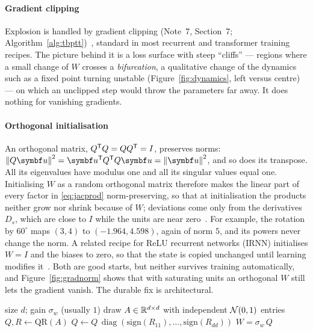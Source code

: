 \documentclass[11pt]{article}
\newcommand{\diag}{\operatorname{diag}}
\begin{document}
\paragraph{Gradient clipping} Explosion is handled by gradient clipping (Note~7, Section~7;
Algorithm~\ref{alg:tbptt})~\cite{pascanu2013}, standard in most recurrent and transformer training recipes. The picture
behind it is a loss surface with steep ``cliffs'' --- regions where a small change of $W$ crosses a \emph{bifurcation}, a
qualitative change of the dynamics such as a fixed point turning unstable (Figure~\ref{fig:dynamics}, left versus
centre) --- on which an unclipped step would throw the parameters far away. It does nothing for vanishing gradients.

\paragraph{Orthogonal initialisation} An orthogonal matrix, $Q^{\mathsf{T}} Q = QQ^{\mathsf{T}} = I$, preserves norms:
$\norm{Q\vect{u}}^2 = \vect{u}\T Q\T Q\vect{u} = \norm{\vect{u}}^2$, and so does its transpose. All its eigenvalues have
modulus one and all its singular values equal one. Initialising $W$ as a random orthogonal matrix therefore makes the
linear part of every factor in \eqref{eq:jacprod} norm-preserving, so that at initialisation the products neither
grow nor shrink because of $W$; deviations come only from the derivatives $D_s$, which are close to $I$ while the units
are near zero~\cite{saxe2014}. For example, the rotation by $60^\circ$ maps $(3, 4)$ to $(-1.964, 4.598)$, again of norm
$5$, and its powers never change the norm. A related recipe for ReLU recurrent networks (IRNN) initialises $W = I$ and the
biases to zero, so that the state is copied unchanged until learning modifies it~\cite{le2015}. Both are good starts, but
neither survives training automatically, and Figure~\ref{fig:gradnorm} shows that with saturating units an orthogonal $W$
still lets the gradient vanish. The durable fix is architectural.

\begin{algorithm}[htbp]
\caption{Random orthogonal initialisation of a recurrent matrix}\label{alg:orth}
\begin{algorithmic}[1]
\Require size $d$; gain $\sigma_w$ (usually $1$)
  \State draw $A \in \mathbb{R}^{d \times d}$ with independent $\mathcal{N}(0, 1)$ entries
  \State $Q, R \gets \mathrm{QR}(A)$ 
  \State $Q \gets Q\,\diag(\mathrm{sign}(R_{11}), \dots, \mathrm{sign}(R_{dd}))$ 
  \State \Return $W = \sigma_w\,Q$
\EndFunction
\end{algorithmic}
\end{algorithm}
\end{document}
